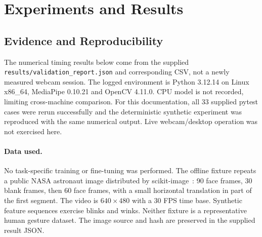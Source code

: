 \documentclass[10pt,twocolumn,letterpaper]{article}
\begin{document}
\section{Experiments and Results}
\subsection{Evidence and Reproducibility}
The numerical timing results below come from the supplied \texttt{results/validation\_report.json} and corresponding CSV, not a newly measured webcam session. The logged environment is Python 3.12.14 on Linux x86\_64, MediaPipe 0.10.21 and OpenCV 4.11.0. CPU model is not recorded, limiting cross-machine comparison. For this documentation, all 33 supplied pytest cases were rerun successfully and the deterministic synthetic experiment was reproduced with the same numerical output. Live webcam/desktop operation was not exercised here.

\paragraph{Data used.} No task-specific training or fine-tuning was performed. The offline fixture repeats a public NASA astronaut image distributed by scikit-image~\cite{astronaut}: 90 face frames, 30 blank frames, then 60 face frames, with a small horizontal translation in part of the first segment. The video is $640\times480$ with a 30 FPS time base. Synthetic feature sequences exercise blinks and winks. Neither fixture is a representative human gesture dataset. The image source and hash are preserved in the supplied result JSON.
\end{document}
